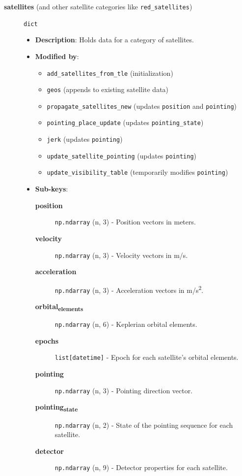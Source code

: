 \documentclass[11pt]{article}
\begin{document}
\begin{description}
\item[{\textbf{satellites} (and other satellite categories like \texttt{red\_satellites})}] \texttt{dict}
\begin{itemize}
\item \textbf{Description}: Holds data for a category of satellites.
\item \textbf{Modified by}:
\begin{itemize}
\item \texttt{add\_satellites\_from\_tle} (initialization)
\item \texttt{geos} (appends to existing satellite data)
\item \texttt{propagate\_satellites\_new} (updates \texttt{position} and \texttt{pointing})
\item \texttt{pointing\_place\_update} (updates \texttt{pointing\_state})
\item \texttt{jerk} (updates \texttt{pointing})
\item \texttt{update\_satellite\_pointing} (updates \texttt{pointing})
\item \texttt{update\_visibility\_table} (temporarily modifies \texttt{pointing})
\end{itemize}
\item \textbf{Sub-keys}:
\begin{description}
\item[{\textbf{position}}] \texttt{np.ndarray} (n, 3) - Position vectors in meters.
\item[{\textbf{velocity}}] \texttt{np.ndarray} (n, 3) - Velocity vectors in m/s.
\item[{\textbf{acceleration}}] \texttt{np.ndarray} (n, 3) - Acceleration vectors in m/s\textsuperscript{2}.
\item[{\textbf{orbital\textsubscript{elements}}}] \texttt{np.ndarray} (n, 6) - Keplerian orbital elements.
\item[{\textbf{epochs}}] \texttt{list[datetime]} - Epoch for each satellite's orbital elements.
\item[{\textbf{pointing}}] \texttt{np.ndarray} (n, 3) - Pointing direction vector.
\item[{\textbf{pointing\textsubscript{state}}}] \texttt{np.ndarray} (n, 2) - State of the pointing sequence for each satellite.
\item[{\textbf{detector}}] \texttt{np.ndarray} (n, 9) - Detector properties for each satellite.
\end{description}
\end{itemize}


\end{description}
\end{document}
